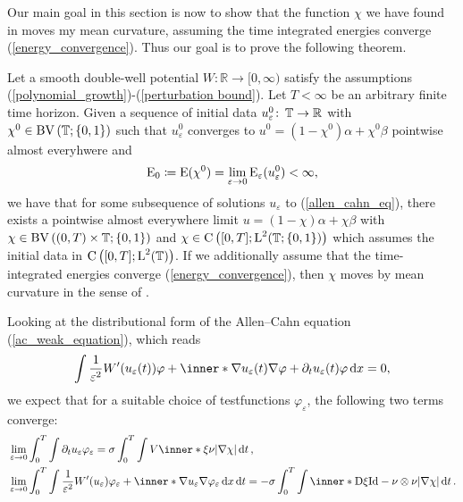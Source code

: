 Our main goal in this section is now to show that the function $ \chi $ we have 
found in  moves my mean curvature, assuming 
the time integrated energies converge (\ref{energy_convergence}). Thus our 
goal is to prove the following theorem.
\begin{theorem}
	\label{convergence_to_twophase_mcf}
	Let a smooth double-well potential $ W \colon \mathbb{ R } \to [ 0, \infty 
	) 
	$ satisfy the assumptions (\ref{polynomial_growth})-(\ref{perturbation 
		bound}). Let $ T < \infty $ be an arbitrary finite time horizon. Given 
		a 
	sequence of initial data $ u_{ \varepsilon }^{ 0 } \colon \operatorname{\mathbb{T}} \to 
	\mathbb{ R } $ with $ \chi^{ 0 } \in \operatorname{BV} \left( \operatorname{\mathbb{T}} ; \{ 0 , 1 \} 
	\right) 
	$ such that $ u_{ \varepsilon }^{ 0 } $ converges to $ u^{ 0 } = ( 1- 
	\chi^{ 0} ) \alpha 
	+ \chi^{ 0 } \beta $ pointwise almost everyhwere and
	\begin{equation*}
		\operatorname{E}_{ 0 }
		\coloneqq
		\operatorname{E} ( \chi^{ 0 } )
		=
		\lim_{ \varepsilon \to 0 }
		\operatorname{E}_{ \varepsilon } ( u_{ \varepsilon}^{ 0 } )
		< 
		\infty,
	\end{equation*}
	we have that for some subsequence of solutions $ u_{ \varepsilon } $ 
	to 
	(\ref{allen_cahn_eq}), there exists a pointwise 
	almost everywhere limit $ u = ( 1 - \chi ) \alpha + \chi \beta $ with $ 
	\chi \in \operatorname{BV} \left( ( 0, T ) \times \operatorname{\mathbb{T}} ; \{ 0 , 1 \} \right) $ and
	$ \chi \in \operatorname{C} \left( [ 0 , T ] ; \operatorname{L}^{ 2 } (\operatorname{\mathbb{T}} ; \{ 0 , 1 \} ) 
	\right) $ which assumes the initial data in $ \operatorname{C} \left( [ 0, T ] ; 
	\operatorname{L}^{ 2 }( \operatorname{\mathbb{T}} ) \right) $. If we additionally assume that the 
	time-integrated energies converge (\ref{energy_convergence}), then $ \chi 
	$ moves by mean curvature in the sense of .
\end{theorem} 
Looking at the distributional form of the Allen--Cahn equation 
(\ref{ac_weak_equation}), which reads
\begin{equation*}
	\int
	\frac{ 1 }{ \varepsilon^{ 2 } } W' ( u_{ \varepsilon} ( t ) ) \varphi
	+
	\inner*{ \nabla u_{ \varepsilon } ( t ) }{\nabla \varphi }
	+
	\partial_{ t } u_{ \varepsilon} ( t ) \varphi 
	\dd{x}
	=
	0,
\end{equation*}
we expect that for a suitable choice of testfunctions $ \varphi_{ \varepsilon } 
$, the following two terms converge:
\begin{align*}
	& \lim_{ \varepsilon \to 0 }
	\int_{ 0 }^{ T }
	\int 
	\partial_{ t } u_{ \varepsilon } \varphi_{ \varepsilon }
	=
	\sigma
	\int_{ 0 }^{ T }
	\int
	V \inner*{ \xi }{ \nu }
	\abs{ \nabla \chi }
	\dd{ t },
	\\
	& \lim_{ \varepsilon \to 0 }
	\int_{ 0 }^{ T }
	\int
	\frac{1 }{ \varepsilon^{ 2 } }
	W'( u_{ \varepsilon } )
	\varphi_{ \varepsilon}
	+ 
	\inner*{ \nabla u_{ \varepsilon } }{ \nabla \varphi_{ \varepsilon } }
	\dd{ x }
	\dd{ t }
	=
	- 
	\sigma \int_{ 0 }^{ T }
	\int
	\inner*{ \diff \xi }{ \mathrm{Id} - \nu \otimes \nu }
	\abs{ \nabla \chi }
	\dd{ t }.
\end{align*}
